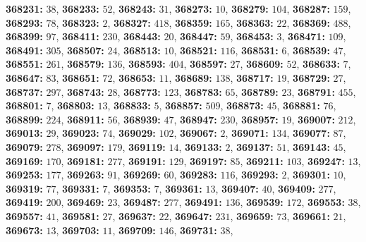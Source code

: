 \textsf{\bfseries 368231:} $38$, \textsf{\bfseries 368233:} $52$, \textsf{\bfseries 368243:} $31$, \textsf{\bfseries 368273:} $10$, \textsf{\bfseries 368279:} $104$, \textsf{\bfseries 368287:} $159$, \textsf{\bfseries 368293:} $78$, \textsf{\bfseries 368323:} $2$, \textsf{\bfseries 368327:} $418$, \textsf{\bfseries 368359:} $165$, \textsf{\bfseries 368363:} $22$, \textsf{\bfseries 368369:} $488$, \textsf{\bfseries 368399:} $97$, \textsf{\bfseries 368411:} $230$, \textsf{\bfseries 368443:} $20$, \textsf{\bfseries 368447:} $59$, \textsf{\bfseries 368453:} $3$, \textsf{\bfseries 368471:} $109$, \textsf{\bfseries 368491:} $305$, \textsf{\bfseries 368507:} $24$, \textsf{\bfseries 368513:} $10$, \textsf{\bfseries 368521:} $116$, \textsf{\bfseries 368531:} $6$, \textsf{\bfseries 368539:} $47$, \textsf{\bfseries 368551:} $261$, \textsf{\bfseries 368579:} $136$, \textsf{\bfseries 368593:} $404$, \textsf{\bfseries 368597:} $27$, \textsf{\bfseries 368609:} $52$, \textsf{\bfseries 368633:} $7$, \textsf{\bfseries 368647:} $83$, \textsf{\bfseries 368651:} $72$, \textsf{\bfseries 368653:} $11$, \textsf{\bfseries 368689:} $138$, \textsf{\bfseries 368717:} $19$, \textsf{\bfseries 368729:} $27$, \textsf{\bfseries 368737:} $297$, \textsf{\bfseries 368743:} $28$, \textsf{\bfseries 368773:} $123$, \textsf{\bfseries 368783:} $65$, \textsf{\bfseries 368789:} $23$, \textsf{\bfseries 368791:} $455$, \textsf{\bfseries 368801:} $7$, \textsf{\bfseries 368803:} $13$, \textsf{\bfseries 368833:} $5$, \textsf{\bfseries 368857:} $509$, \textsf{\bfseries 368873:} $45$, \textsf{\bfseries 368881:} $76$, \textsf{\bfseries 368899:} $224$, \textsf{\bfseries 368911:} $56$, \textsf{\bfseries 368939:} $47$, \textsf{\bfseries 368947:} $230$, \textsf{\bfseries 368957:} $19$, \textsf{\bfseries 369007:} $212$, \textsf{\bfseries 369013:} $29$, \textsf{\bfseries 369023:} $74$, \textsf{\bfseries 369029:} $102$, \textsf{\bfseries 369067:} $2$, \textsf{\bfseries 369071:} $134$, \textsf{\bfseries 369077:} $87$, \textsf{\bfseries 369079:} $278$, \textsf{\bfseries 369097:} $179$, \textsf{\bfseries 369119:} $14$, \textsf{\bfseries 369133:} $2$, \textsf{\bfseries 369137:} $51$, \textsf{\bfseries 369143:} $45$, \textsf{\bfseries 369169:} $170$, \textsf{\bfseries 369181:} $277$, \textsf{\bfseries 369191:} $129$, \textsf{\bfseries 369197:} $85$, \textsf{\bfseries 369211:} $103$, \textsf{\bfseries 369247:} $13$, \textsf{\bfseries 369253:} $177$, \textsf{\bfseries 369263:} $91$, \textsf{\bfseries 369269:} $60$, \textsf{\bfseries 369283:} $116$, \textsf{\bfseries 369293:} $2$, \textsf{\bfseries 369301:} $10$, \textsf{\bfseries 369319:} $77$, \textsf{\bfseries 369331:} $7$, \textsf{\bfseries 369353:} $7$, \textsf{\bfseries 369361:} $13$, \textsf{\bfseries 369407:} $40$, \textsf{\bfseries 369409:} $277$, \textsf{\bfseries 369419:} $200$, \textsf{\bfseries 369469:} $23$, \textsf{\bfseries 369487:} $277$, \textsf{\bfseries 369491:} $136$, \textsf{\bfseries 369539:} $172$, \textsf{\bfseries 369553:} $38$, \textsf{\bfseries 369557:} $41$, \textsf{\bfseries 369581:} $27$, \textsf{\bfseries 369637:} $22$, \textsf{\bfseries 369647:} $231$, \textsf{\bfseries 369659:} $73$, \textsf{\bfseries 369661:} $21$, \textsf{\bfseries 369673:} $13$, \textsf{\bfseries 369703:} $11$, \textsf{\bfseries 369709:} $146$, \textsf{\bfseries 369731:} $38$, 
